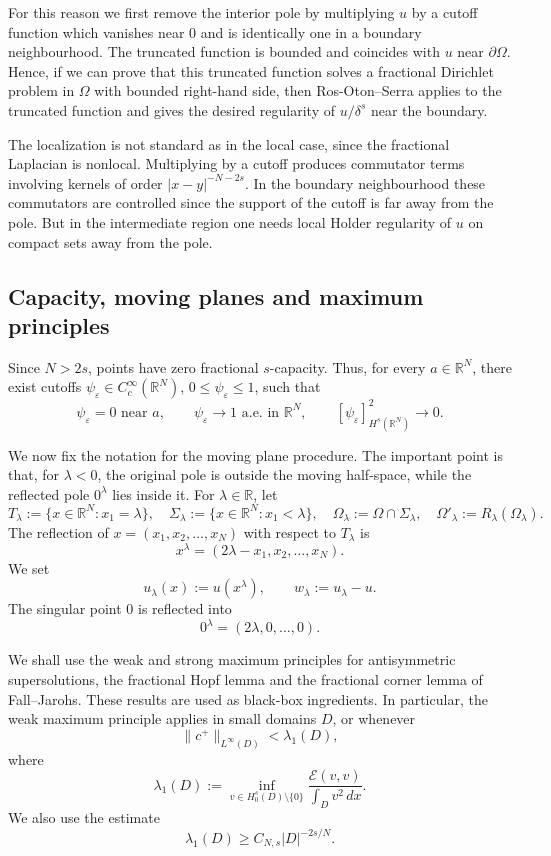 \documentclass[11pt,a4paper]{article}
\newcommand{\R}{\mathbb R}
\newcommand{\dd}{\,d}
\begin{document}
For this reason we first remove the interior pole by multiplying \(u\) by a
cutoff function which vanishes near \(0\) and is identically one in a boundary
neighbourhood. The truncated function is bounded and coincides with \(u\) near
\(\partial\Omega\). Hence, if we can prove that this truncated function solves a
fractional Dirichlet problem in \(\Omega\) with bounded right-hand side, then
Ros-Oton--Serra applies to the truncated function and gives the desired
regularity of \(u/\delta^s\) near the boundary.

The localization is not standard as in the local case, since the fractional Laplacian is
nonlocal. Multiplying by a cutoff produces commutator terms involving kernels
of order \(|x-y|^{-N-2s}\). In the boundary neighbourhood these commutators are
controlled since the support of the cutoff is far away from the pole. But in the intermediate
region one needs local Holder regularity of \(u\) on compact sets
away from the pole.

\subsection{Capacity, moving planes and maximum principles}

Since \(N>2s\), points have zero fractional \(s\)-capacity. Thus, for every \(a\in\R^N\), there exist cutoffs \(\psi_\varepsilon\in C_c^\infty(\R^N)\), \(0\le\psi_\varepsilon\le1\), such that
\begin{equation}
\psi_\varepsilon=0\text{ near }a,\qquad
\psi_\varepsilon\to1\text{ a.e. in }\R^N,\qquad
[\psi_\varepsilon]_{H^s(\R^N)}^2\to0.
\end{equation}

We now fix the notation for the moving plane procedure. The important point is that, for \(\lambda<0\), the original pole is outside the moving half-space, while the reflected pole \(0^\lambda\) lies inside it. For \(\lambda\in\R\), let
\[
T_\lambda:=\{x\in\R^N:x_1=\lambda\},
\quad
\Sigma_\lambda:=\{x\in\R^N:x_1<\lambda\},
\quad
\Omega_\lambda:=\Omega\cap\Sigma_\lambda,
\quad \Omega'_{\lambda} := R_{\lambda}(\Omega_{\lambda}).
\]
The reflection of \(x=(x_1,x_2,\dots,x_N)\) with respect to \(T_\lambda\) is
\[
x^\lambda=(2\lambda-x_1,x_2,\dots,x_N).
\]
We set
\[
u_\lambda(x):=u(x^\lambda),
\qquad
w_\lambda:=u_\lambda-u.
\]
The singular point \(0\) is reflected into
\[
0^\lambda=(2\lambda,0,\dots,0).
\]

We shall use the weak and strong maximum principles for antisymmetric supersolutions, the fractional Hopf lemma and the fractional corner lemma of Fall--Jarohs. These results are used as black-box ingredients. In particular, the weak maximum principle applies in small domains \(D\), or whenever
\[
\|c^+\|_{L^\infty(D)}<\lambda_1(D),
\]
where
\begin{equation}\label{eq:first eigenvalue}
\lambda_1(D) :=
\inf_{v\in H^s_0(D)\setminus\{0\}}
\frac{\mathcal E(v,v)}{\int_D v^2\dd x}.
\end{equation}
We also use the estimate
\begin{equation}
\lambda_1(D)\ge C_{N,s}|D|^{-2s/N}.
\end{equation}
\end{document}
